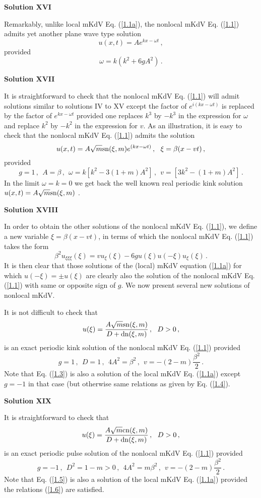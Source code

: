 \documentclass[11pt]{article}
\newcommand{\be}{\begin{equation}}
\newcommand{\ee}{\end{equation}}
\newcommand{\sn}{{\rm sn}}
\newcommand{\dn}{{\rm dn}}
\newcommand{\cn}{{\rm cn}}
\begin{document}
{\bf Solution XVI}

Remarkably, unlike local mKdV Eq. (\ref{1.1a}), the nonlocal mKdV 
Eq. (\ref{1.1}) admits yet another plane wave type solution
\be\label{7.31}
u(x,t) = A e^{kx-\omega t}\,,
\ee
provided 
\be\label{7.32}
\omega = k(k^2 +6g A^2)\,.
\ee

{\bf Solution XVII} 

It is straightforward to check that the nonlocal mKdV Eq. (\ref{1.1})
will admit solutions similar to solutions IV to XV except the factor of 
$e^{i(kx-\omega t)}$ is replaced by the factor of $e^{kx-\omega t}$ provided
one replaces $k^3$ by $-k^3$ in the expression for $\omega$ and replace 
$k^2$ by $-k^2$ in the expression for $v$. As an illustration, it is easy to 
check that the nonlocal mKdV Eq. (\ref{1.1}) admits the solution
\be\label{7.33}
u(x,t) = A \sqrt{m} \sn(\xi,m) e^{(kx-\omega t)}\,,~~\xi = \beta(x-vt)\,,
\ee
provided
\be\label{7.34}
g = 1\,,~~A = \beta\,,~~\omega = k[k^2-3(1+m)A^2]\,,~~v = [3k^2
-(1+m)A^2]\,.
\ee
In the limit $\omega = k = 0$ we get back the well known real periodic 
kink solution $u(x,t)=A\sqrt{m} \sn(\xi,m)$ \cite{ks1,ks3}. 

{\bf Solution XVIII}

In order to obtain the other solutions of the nonlocal mKdV Eq. (\ref{1.1}), we 
define a new variable $\xi = \beta (x-vt)$, in terms of 
which the nonlocal mKdV Eq. (\ref{1.1}) takes the form
\be\label{1.2}
\beta^2 u_{\xi \xi \xi}(\xi) = v u_{\xi}(\xi) - 6g u(\xi)u(-\xi) u_{\xi}(\xi)\,.
\ee
It is then clear that those solutions of the (local) mKdV equation
(\ref{1.1a}) for which $u(-\xi) = \pm u(\xi)$ are clearly
also the solution of the nonlocal mKdV Eq. (\ref{1.1}) with same or
opposite sign of $g$. We now present several new solutions of
nonlocal mKdV.


It is not difficult to check that 
\be\label{1.3}
u(\xi) = \frac{A\sqrt{m}\sn(\xi,m)}{D+\dn(\xi,m)}\,,~~D > 0\,,
\ee
is an exact periodic kink solution of the nonlocal mKdV Eq. (\ref{1.1}) 
provided
\be\label{1.4}
g = 1\,,~~D = 1\,,~~4 A^2 = \beta^2\,,~~v = -(2-m)\frac{\beta^2}{2}\,.
\ee
Note that Eq. (\ref{1.3}) is also a solution of the local mKdV 
Eq. (\ref{1.1a}) except $g = -1$ in that case (but otherwise same relations
as given by Eq. (\ref{1.4}).

{\bf Solution XIX}

It is straightforward to check that 
\be\label{1.5}
u(\xi) = \frac{A\sqrt{m}\cn(\xi,m)}{D+\dn(\xi,m)}\,,~~D > 0\,,
\ee
is an exact periodic pulse solution of the nonlocal mKdV Eq. (\ref{1.1}) 
provided
\be\label{1.6}
g = -1\,,~~D^2 = 1-m > 0\,,~~4 A^2 = m \beta^2\,,~~v 
= -(2-m)\frac{\beta^2}{2}\,.
\ee
Note that Eq. (\ref{1.5}) is also a solution of the local mKdV 
Eq. (\ref{1.1a}) provided the relations (\ref{1.6}) are satisfied.
\end{document}
